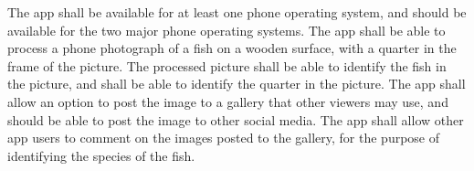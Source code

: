 The app shall be available for at least one phone operating system, and should be available for the two major phone operating systems. The app shall be able to process a phone photograph of a fish on a wooden surface, with a quarter in the frame of the picture. The processed picture shall be able to identify the fish in the picture, and shall be able to identify the quarter in the picture. The app shall allow an option to post the image to a gallery that other viewers may use, and should be able to post the image to other social media. The app shall allow other app users to comment on the images posted to the gallery, for the purpose of identifying the species of the fish.
